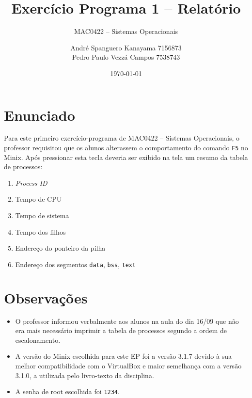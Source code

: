 \documentclass[brazil, a4paper]{scrartcl}
\begin{document}
\title{Exercício Programa 1 -- Relatório}
\subtitle{MAC0422 -- Sistemas Operacionais}
\author{André Spanguero Kanayama \hfill 7156873\\
		Pedro Paulo Vezzá Campos \hfill 7538743}
\date{\today}

\maketitle


\section{Enunciado}
Para este primeiro exercício-programa de MAC0422 -- Sistemas Operacionais, o 
professor requisitou que os alunos alterassem o comportamento do comando
\texttt{F5} no Minix. Após pressionar esta tecla deveria ser exibido
na tela um resumo da tabela de processos:

\begin{enumerate}
	\item \emph{Process ID}
	\item Tempo de CPU
	\item Tempo de sistema
	\item Tempo dos filhos
	\item Endereço do ponteiro da pilha
	\item Endereço dos segmentos \texttt{data}, \texttt{bss}, \texttt{text} 
\end{enumerate}

\section{Observações}
\begin{itemize}
	\item O professor informou verbalmente aos alunos na aula do dia 16/09 que
	não era mais necessário imprimir a tabela de processos segundo a ordem de
	escalonamento.
	\item A versão do Minix escolhida para este EP foi a versão 3.1.7 devido à
	sua melhor compatibilidade com o VirtualBox e maior semelhança com a versão 
	3.1.0, a utilizada pelo livro-texto da disciplina.
	\item A senha de root escolhida foi \texttt{1234}.
\end{itemize}
\end{document}
